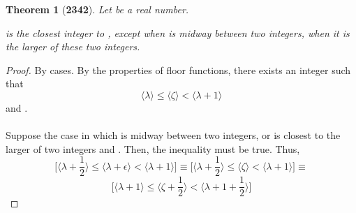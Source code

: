 \documentclass[preview]{standalone}
\newtheorem{theorem}{Theorem}
\begin{document}
\begin{theorem}[\textbf{2342}]
    Let \bm{$\zeta$} be a real number.
    \begin{center}
        is the closest integer to \bm{$\zeta$}, 
        except when \bm{$\zeta$} is midway between two integers, 
        when it is the larger of these two integers.
    \end{center}
\end{theorem}

\begin{proof}
    By cases. By the properties of floor functions, 
    there exists an integer \bm{$\lambda$} such that 
    \begin{equation*}
        \Big \langle \lambda \Big \rangle
            \le 
        \Big \langle \zeta \Big \rangle
            < 
        \Big \langle \lambda + 1 \Big \rangle
    \end{equation*}
    and 
    \bm{$\zeta - \lfloor \zeta \rfloor = \epsilon$}.
    \\ \\
     Suppose the case in which \bm{$\zeta$} is midway between two integers, 
    or is closest to the larger of two integers \bm{$\lambda$} and 
    \bm{$\big \langle \lambda + 1 \big \rangle$}. 
    Then, the inequality  must be true. Thus, 
    \begin{equation*}
        \bigg[
            \Big \langle
                \lambda + \frac{1}{2}
            \Big \rangle
                \leq 
            \Big \langle
                \lambda + \epsilon
            \Big \rangle
                <
            \Big \langle
                \lambda + 1
            \Big \rangle
        \bigg]
            \equiv
        \bigg[
            \Big \langle    
                \lambda + \frac{1}{2}
            \Big \rangle
                \leq
            \Big \langle
                \zeta
            \Big \rangle
                <
            \Big \langle
                \lambda + 1
            \Big \rangle
        \bigg]
            \equiv
    \end{equation*}
    \begin{equation*}
        \bigg[
            \Big \langle 
                \lambda + 1
            \Big \rangle
                \leq
            \Big \langle 
                \zeta + \frac{1}{2}
            \Big \rangle
                <
            \Big \langle
                \lambda + 1 + \frac{1}{2}
            \Big \rangle
        \bigg]

\end{equation*}
\end{proof}
\end{document}
